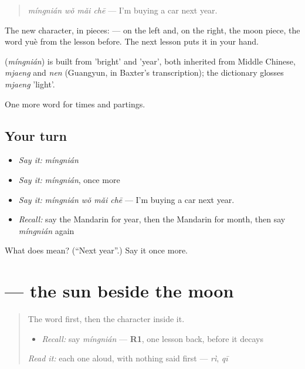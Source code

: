 \begin{quote}
\textbf{} \emph{míngnián wǒ mǎi chē} — I'm buying a car next year.
\end{quote}

The new character, in pieces:  —  on the left and, on the right, the moon piece, the word yuè from the lesson before. The next lesson puts it in your hand.

\begin{cousinweb}
\textbf{} (\emph{míngnián}) is built from  'bright' and  'year', both inherited from Middle Chinese, \emph{mjaeng} and \emph{nen} (Guangyun, in Baxter's transcription); the dictionary glosses \emph{mjaeng} 'light'.
\end{cousinweb}

\begin{grammarlens}[title={What you've built}]
One more word for times and partings.
\end{grammarlens}

\subsection*{Your turn}
\begin{itemize}
\raggedright
  \item \emph{Say it:} \emph{míngnián}
  \item \emph{Say it:} \emph{míngnián}, once more
  \item \emph{Say it:} \emph{míngnián wǒ mǎi chē} — I'm buying a car next year.
  \item \emph{Recall:} say the Mandarin for year, then the Mandarin for month, then say \emph{míngnián} again
\end{itemize}

\begin{tcolorbox}[breakable,colback=teal!4,colframe=teal!35!black,title={Before you move on}]
What does  mean? (\textquotedblleft{}Next year\textquotedblright{}.) Say it once more.
\end{tcolorbox}
\section[\texorpdfstring{\zh{明} (míng)}{明 (míng)}]{ — the sun beside the moon}

\label{lesson:ZH-W47-ming-bright}



\begin{quote}
The word first, then the character inside it.

\begin{itemize}
\raggedright
  \item \emph{Recall:} say \emph{míngnián} — \textbf{R1}, one lesson back, before it decays
\end{itemize}

\begin{quote}
 
\end{quote}

\emph{Read it:} each one aloud, with nothing said first — \emph{rì}, \emph{qī}
\end{quote}

